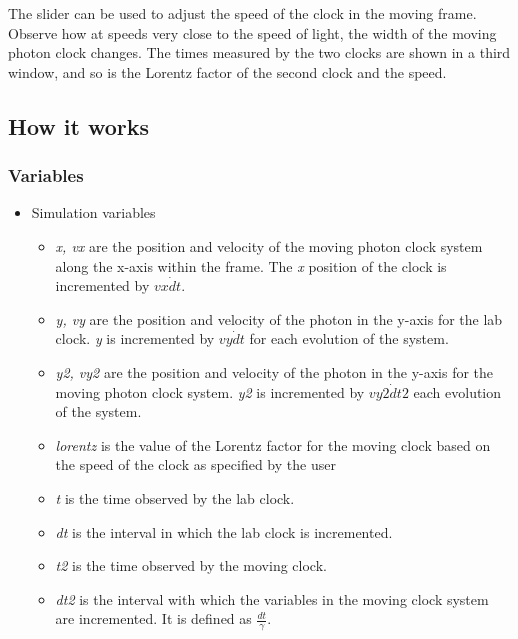 \documentclass[11pt]{article}
\begin{document}
The slider can be used to adjust the speed of the clock in the moving frame. Observe how at speeds very close to the speed of light, the width of the moving photon clock changes.
The times measured by the two clocks are shown in a third window, and so is the Lorentz factor of the second clock and the speed.
\subsection*{How it works}
\label{sec-3-3}
\subsubsection*{Variables}
\label{sec-3-3-1}
\begin{itemize}

\item Simulation variables
\label{sec-3-3-1-1}%
\begin{itemize}
\item \emph{x, vx} are the position and velocity of the moving photon clock system along the x-axis within the frame. The \emph{x} position of the clock is incremented by $vx\dot dt$.
\item \emph{y, vy} are the position and velocity of the photon in the y-axis for the lab clock. \emph{y} is incremented by $vy\dot dt$ for each evolution of the system.
\item \emph{y2, vy2} are the position and velocity of the photon in the y-axis for the moving photon clock system. \emph{y2} is incremented by $vy2\dot dt2$ each evolution of the system.
\item \emph{lorentz} is the value of the Lorentz factor for the moving clock based on the speed of the clock as specified by the user
\item \emph{t} is the time observed by the lab clock.
\item \emph{dt} is the interval in which the lab clock is incremented.
\item \emph{t2} is the time observed by the moving clock.
\item \emph{dt2} is the interval with which the variables in the moving clock system are incremented. It is defined as $\frac{dt}{\gamma}$.
\end{itemize}



\end{itemize}
\end{document}
